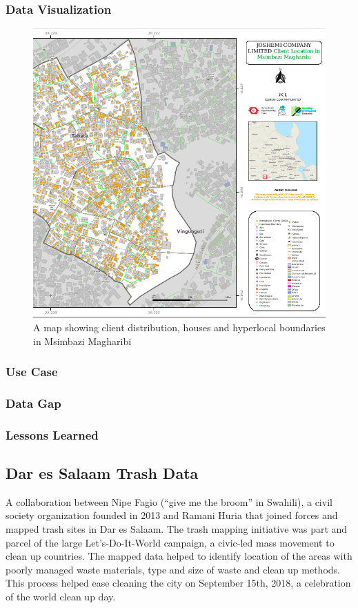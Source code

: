 \documentclass[a4paper,12pt,twoside]{article}
\begin{document}
\subsubsection{Data Visualization}
\begin{figure}[h]
  \color{RHgreen}\caption{A map showing client distribution, houses and hyperlocal boundaries in Msimbazi Magharibi}
  \centering
 \includegraphics[width=0.8 \textwidth]{images/msimbazi_mama_data_viz.png}
\end{figure}


\subsubsection{Use Case}
\subsubsection{Data Gap}
\subsubsection{Lessons Learned}


\newpage
\subsection{Dar es Salaam Trash Data}

A collaboration between Nipe Fagio (“give me the broom” in Swahili), a civil society organization founded in 2013 and Ramani Huria that joined forces and mapped trash sites in Dar es Salaam. The trash mapping initiative was part and parcel of the large Let’s-Do-It-World campaign, a civic-led mass movement to clean up countries.
The mapped data helped to identify location of the areas with poorly managed waste materials, type and size of waste and clean up methods. This process helped ease cleaning the city on September 15th, 2018, a celebration of the world clean up day.
\end{document}

